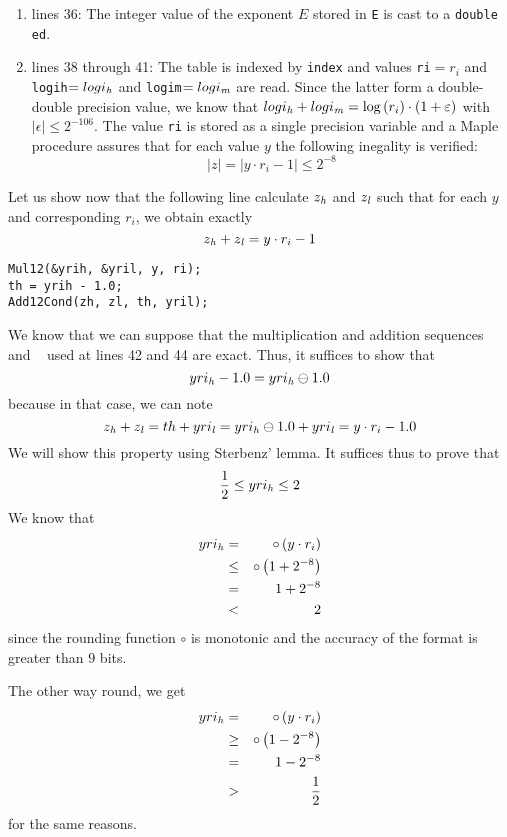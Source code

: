{\begin{enumerate}
\item lines 36: The integer value of the exponent $E$ stored in {\tt E} is cast to a {\tt double ed}.
\item lines 38 through 41: The table is indexed by {\tt index} and values {\tt ri}$=r_i$ and 
{\tt logih}$=logi_{\mathit{h}}$ and {\tt logim}$=logi_{\mathit{m}}$ are read. 
Since the latter form a double-double precision value, we know that 
$logi_{\mathit{h}} + logi_{\mathit{m}} = \log\left( r_i \right) \cdot \left( 1 + \varepsilon \right)$ with $\left \vert \epsilon \right \vert \leq 2^{-106}$.
The value {\tt ri} is stored as a single precision variable and a Maple procedure assures that for each value
$y$ the following inegality is verified:
$$\left \vert z \right \vert = \left \vert y \cdot r_i - 1 \right \vert \leq 2^{-8}$$
\end{enumerate}
} 
Let us show now that the following line calculate $z_{\mathit{h}}$ and $z_{\mathit{l}}$ such that for each $y$ and corresponding $r_i$,
we obtain exactly
$$z_{\mathit{h}} + z_{\mathit{l}} = y \cdot r_i - 1$$
\begin{lstlisting}[caption={Argument reduction},firstnumber=42]
Mul12(&yrih, &yril, y, ri);
th = yrih - 1.0; 
Add12Cond(zh, zl, th, yril); 
\end{lstlisting}
We know that we can suppose that the multiplication and addition sequences \Mul~ and \Add~ used at lines
42 and 44 are exact. Thus, it suffices to show that
$$yri_{\mathit{h}} - 1.0 = yri_{\mathit{h}} \ominus 1.0$$
because in that case, we can note
$$z_{\mathit{h}} + z_{\mathit{l}} = th + yri_{\mathit{l}} = yri_{\mathit{h}} \ominus 1.0 + yri_{\mathit{l}} = y \cdot r_i - 1.0$$
We will show this property using Sterbenz' lemma. It suffices thus to prove that
$$\frac{1}{2} \leq yri_{\mathit{h}} \leq 2$$
We know that 
\begin{eqnarray*}
yri_{\mathit{h}} & = & \circ\left( y \cdot r_i \right) \\
& \leq & \circ \left( 1 + 2^{-8} \right) \\
& = & 1 + 2^{-8} \\
& < & 2
\end{eqnarray*}
since the rounding function $\circ$ is monotonic and the accuracy of the format is greater than $9$ bits.

The other way round, we get
\begin{eqnarray*}
yri_{\mathit{h}} & = & \circ \left( y \cdot r_i \right) \\
& \geq & \circ \left( 1 - 2^{-8} \right) \\
& = & 1 - 2^{-8} \\
& > & \frac{1}{2}
\end{eqnarray*}
for the same reasons.

